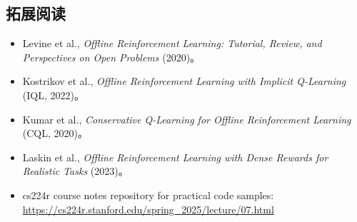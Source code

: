 \documentclass[a4paper]{article}
\begin{document}
\subsection{拓展阅读}
\begin{itemize}
    \item Levine et al., \textit{Offline Reinforcement Learning: Tutorial, Review, and Perspectives on Open Problems} (2020)。
    \item Kostrikov et al., \textit{Offline Reinforcement Learning with Implicit Q-Learning} (IQL, 2022)。
    \item Kumar et al., \textit{Conservative Q-Learning for Offline Reinforcement Learning} (CQL, 2020)。
    \item Laskin et al., \textit{Offline Reinforcement Learning with Dense Rewards for Realistic Tasks} (2023)。
    \item cs224r course notes repository for practical code samples: \url{https://cs224r.stanford.edu/spring_2025/lecture/07.html}
\end{itemize}
\end{document}
